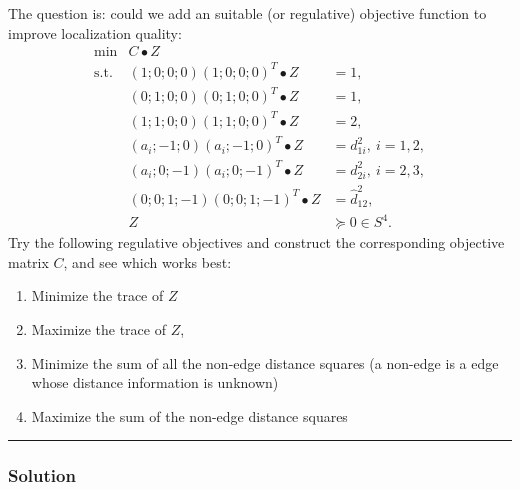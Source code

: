 \documentclass[answers]{exam}
\begin{document}
The question is: could we add an suitable (or regulative) objective function to improve localization quality:
\[\begin{array}{ccl}
\min          &  C\bullet Z &\\
\mbox{s.t.}&(1;0;0;0)(1;0;0;0)^T\bullet Z &=1,\\
&(0;1;0;0)(0;1;0;0)^T\bullet Z& =1,\\
&(1;1;0;0)(1;1;0;0)^T\bullet Z& =2,\\
&(a_i;-1;0)(a_i;-1;0)^T\bullet Z &= d^2_{1i},\ i=1,2,\\
&(a_i;0;-1)(a_i;0;-1)^T\bullet Z &= d^2_{2i},\ i=2,3,\\
&(0;0;1;-1)(0;0;1;-1)^T\bullet Z&=\hat{d}^2_{12},\\
&Z &\succeq 0\in S^4.
\end{array}
\]
Try the following regulative objectives and construct the corresponding objective matrix $C$, and see which works best:

\begin{enumerate}[topsep=0pt,itemsep=-1ex,partopsep=1ex,parsep=1ex]
    


\item Minimize the trace of $Z$
\item Maximize the trace of $Z$,
\item Minimize the sum of all the non-edge distance squares (a non-edge is a edge whose distance information is unknown)
\item Maximize the sum of the non-edge distance squares
\end{enumerate}
\rule{\textwidth}{1pt}
\subsubsection*{Solution}
\newpage
\end{document}
